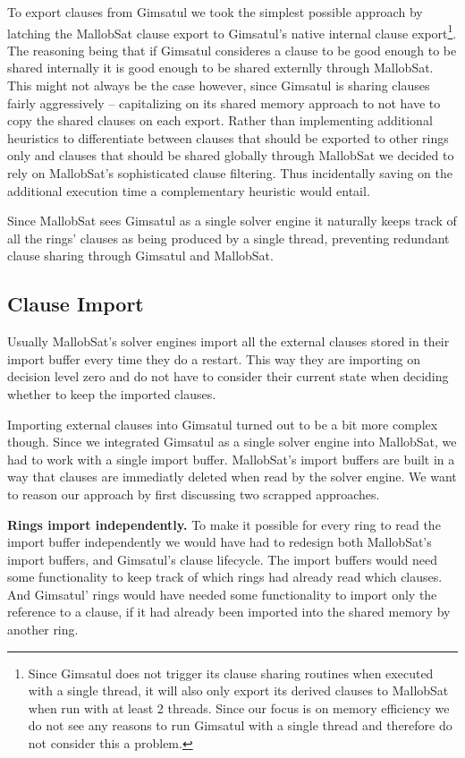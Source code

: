 \documentclass[12pt,a4paper,twoside]{scrartcl}
\numberwithin{equation}{section}
\begin{document}
To export clauses from Gimsatul we took the simplest possible approach by latching the MallobSat clause export to Gimsatul's native internal clause export\footnote{Since Gimsatul does not trigger its clause sharing routines when executed with a single thread, it will also only export its derived clauses to MallobSat when run with at least 2 threads. Since our focus is on memory efficiency we do not see any reasons to run Gimsatul with a single thread and therefore do not consider this a problem.}. The reasoning being that if Gimsatul consideres a clause to be good enough to be shared internally it is good enough to be shared externlly through MallobSat. This might not always be the case however, since Gimsatul is sharing clauses fairly aggressively -- capitalizing on its shared memory approach to not have to copy the shared clauses on each export. Rather than implementing additional heuristics to differentiate between clauses that should be exported to other rings only and clauses that should be shared globally through MallobSat we decided to rely on MallobSat's sophisticated clause filtering. Thus incidentally saving on the additional execution time a complementary heuristic would entail.

Since MallobSat sees Gimsatul as a single solver engine it naturally keeps track of all the rings' clauses as being produced by a single thread, preventing redundant clause sharing through Gimsatul and MallobSat.

\subsection{Clause Import}

Usually MallobSat's solver engines import all the external clauses stored in their import buffer every time they do a restart. This way they are importing on decision level zero and do not have to consider their current state when deciding whether to keep the imported clauses. 

Importing external clauses into Gimsatul turned out to be a bit more complex though. Since we integrated Gimsatul as a single solver engine into MallobSat, we had to work with a single import buffer. MallobSat's import buffers are built in a way that clauses are immediatly deleted when read by the solver engine. We want to reason our approach by first discussing two scrapped approaches.

\textbf{Rings import independently.} To make it possible for every ring to read the import buffer independently we would have had to redesign both MallobSat's import buffers, and Gimsatul's clause lifecycle. The import buffers would need some functionality to keep track of which rings had already read which clauses. And Gimsatul' rings would have needed some functionality to import only the reference to a clause, if it had already been imported into the shared memory by another ring. 
\end{document}
